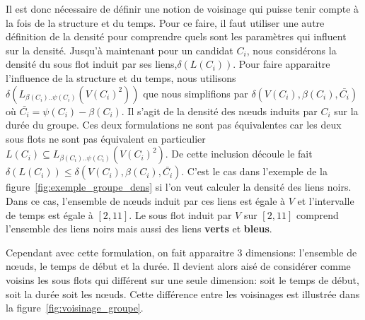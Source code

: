 Il est donc nécessaire de définir une notion de voisinage qui puisse tenir compte à la fois de la structure et du temps.
Pour ce faire, il faut utiliser une autre définition de la densité pour comprendre quels sont les paramètres qui influent sur la densité.
Jusqu'à maintenant pour un candidat $C_i$, nous considérons la densité du sous flot induit par ses liens,$\delta(L(C_i))$.
Pour faire apparaitre l'influence de la structure et du temps, nous utilisons $\delta(L_{\beta(C_i)..\psi(C_i)}(V(C_i)^2))$ que nous simplifions par $\delta(V(C_i),\beta(C_i), \bar{C_i})$ où $\bar{C_i} = \psi(C_i)-\beta(C_i)$.
Il s'agit de la densité des n\oe uds induits par $C_i$ sur la durée du groupe.
Ces deux formulations ne sont pas équivalentes car les deux sous flots ne sont pas équivalent en particulier $L(C_i) \subseteq L_{\beta(C_i)..\psi(C_i)}(V(C_i)^2)$.
De cette inclusion découle le fait $\delta(L(C_i)) \leq \delta(V(C_i),\beta(C_i), \bar{C_i})$.
C'est le cas dans l'exemple de la figure~\ref{fig:exemple_groupe_dens} si l'on veut calculer la densité des liens noirs.
Dans ce cas, l'ensemble de n\oe uds induit par ces liens est égale à $V$ et l'intervalle de temps est égale à $[2,11]$.
Le sous flot induit par $V$ sur $[2,11]$ comprend l'ensemble des liens noirs mais aussi des liens \textcolor{vert_turquoise}{\textbf{verts}} et \textcolor{bleu_window}{\textbf{bleus}}.


Cependant avec cette formulation, on fait apparaitre 3 dimensions: l'ensemble de n\oe uds, le temps de début et la durée.
Il devient alors aisé de considérer comme voisins les sous flots qui différent sur une seule dimension: soit le temps de début, soit la durée soit les n\oe uds.
Cette différence entre les voisinages est illustrée dans la figure~\ref{fig:voisinage_groupe}.

